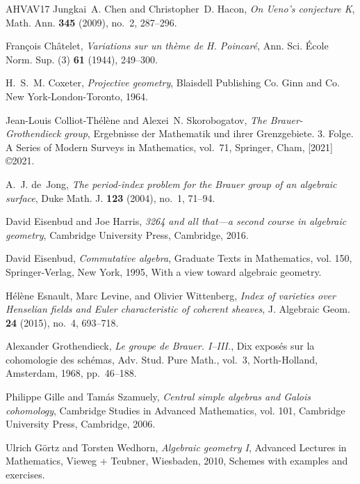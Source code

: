 \documentclass{amsart}
\theoremstyle{definition}
\theoremstyle{remark}
\let \cedilla =\c
\renewcommand{\c}[0]{{\mathbb C}}
\begin{document}
\begin{thebibliography}{AHVAV17}
Jungkai~A. Chen and Christopher~D. Hacon, \emph{On {U}eno's conjecture {K}},
  Math. Ann. \textbf{345} (2009), no.~2, 287--296. 

Fran{\cedilla{c}}ois Ch{\^a}telet, \emph{Variations sur un th\`eme de {H}.
  {P}oincar\'e}, Ann. Sci. \'Ecole Norm. Sup. (3) \textbf{61} (1944), 249--300.

H.~S.~M. Coxeter, \emph{Projective geometry}, Blaisdell Publishing Co. Ginn and
  Co.\, New York-London-Toronto, 1964. 

Jean-Louis Colliot-Th\'el\`ene and Alexei~N. Skorobogatov, \emph{The
  {B}rauer-{G}rothendieck group}, Ergebnisse der Mathematik und ihrer
  Grenzgebiete. 3. Folge. A Series of Modern Surveys in Mathematics, vol.~71, Springer, Cham, [2021] \copyright 2021. 

A.~J. de~Jong, \emph{The period-index problem for the {B}rauer group of an
  algebraic surface}, Duke Math. J. \textbf{123} (2004), no.~1, 71--94.

David Eisenbud and Joe Harris, \emph{3264 and all that---a second course in
  algebraic geometry}, Cambridge University Press, Cambridge, 2016.

David Eisenbud, \emph{Commutative algebra}, Graduate Texts in Mathematics, vol.
  150, Springer-Verlag, New York, 1995, With a view toward algebraic geometry.

H\'{e}l\`ene Esnault, Marc Levine, and Olivier Wittenberg, \emph{Index of
  varieties over {H}enselian fields and {E}uler characteristic of coherent
  sheaves}, J. Algebraic Geom. \textbf{24} (2015), no.~4, 693--718.

Alexander Grothendieck, \emph{Le groupe de {B}rauer. {I--III}.}, Dix expos\'es
  sur la cohomologie des sch\'emas, Adv. Stud. Pure Math., vol.~3,
  North-Holland, Amsterdam, 1968, pp.~46--188. 

Philippe Gille and Tam{\'a}s Szamuely, \emph{Central simple algebras and
  {G}alois cohomology}, Cambridge Studies in Advanced Mathematics, vol. 101,
  Cambridge University Press, Cambridge, 2006. 

Ulrich G{\"o}rtz and Torsten Wedhorn, \emph{Algebraic geometry {I}}, Advanced
  Lectures in Mathematics, Vieweg + Teubner, Wiesbaden, 2010, Schemes with
  examples and exercises. 


\end{thebibliography}
\end{document}
